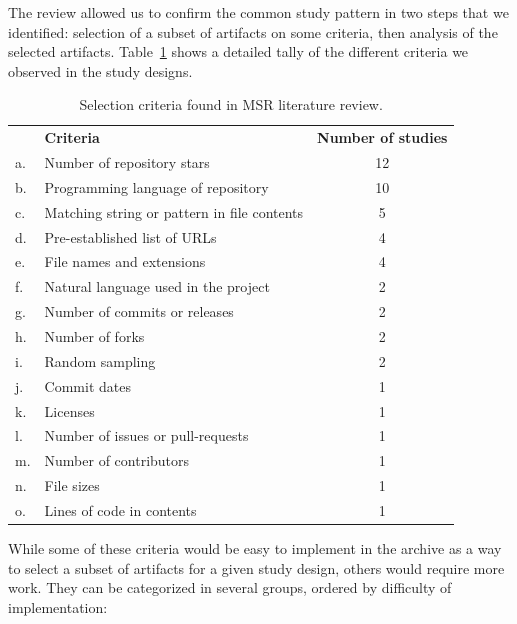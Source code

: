 The review allowed us to confirm the common study pattern in two steps that we
identified: selection of a subset of artifacts on some criteria, then analysis
of the selected artifacts. Table~\ref{tab:selection-criteria} shows a detailed
tally of the different criteria we observed in the study designs.

\begin{table}
    \begin{tabular}{l l c}
        & \textbf{Criteria} & \textbf{Number of studies} \\
         a. & Number of repository stars & 12 \\
         b. & Programming language of repository & 10 \\
         c. & Matching string or pattern in file contents & 5 \\
         d. & Pre-established list of URLs & 4 \\
         e. & File names and extensions & 4 \\
         f. & Natural language used in the project & 2 \\
         g. & Number of commits or releases & 2 \\
         h. & Number of forks & 2 \\
         i. & Random sampling & 2 \\
         j. & Commit dates & 1 \\
         k. & Licenses & 1 \\
         l. & Number of issues or pull-requests & 1 \\
         m. & Number of contributors & 1 \\
         n. & File sizes & 1 \\
         o. & Lines of code in contents & 1 \\
    \end{tabular}
    \centering
    \caption{Selection criteria found in MSR literature review.}%
    \label{tab:selection-criteria}
\end{table}

While some of these criteria would be easy to implement in the archive as a way
to select a subset of artifacts for a given study design, others would require
more work. They can be categorized in several groups, ordered by difficulty of
implementation:

